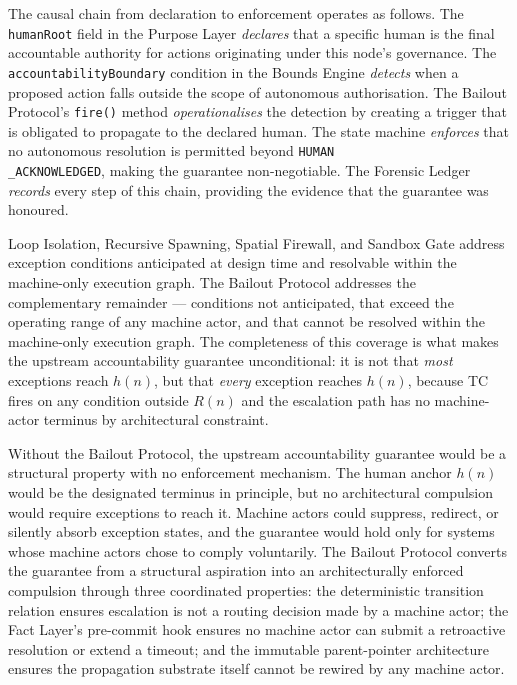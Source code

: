 The causal chain from declaration to enforcement operates as follows. The \texttt{humanRoot} field in the Purpose Layer \emph{declares} that a specific human is the final accountable authority for actions originating under this node's governance. The \texttt{accountabilityBoundary} condition in the Bounds Engine \emph{detects} when a proposed action falls outside the scope of autonomous authorisation. The Bailout Protocol's \texttt{fire()} method \emph{operationalises} the detection by creating a trigger that is obligated to propagate to the declared human. The state machine \emph{enforces} that no autonomous resolution is permitted beyond \texttt{HUMAN\\_ACKNOWLEDGED}, making the guarantee non-negotiable. The Forensic Ledger \emph{records} every step of this chain, providing the evidence that the guarantee was honoured.

Loop Isolation, Recursive Spawning, Spatial Firewall, and Sandbox Gate address exception conditions anticipated at design time and resolvable within the machine-only execution graph. The Bailout Protocol addresses the complementary remainder — conditions not anticipated, that exceed the operating range of any machine actor, and that cannot be resolved within the machine-only execution graph. The completeness of this coverage is what makes the upstream accountability guarantee unconditional: it is not that \emph{most} exceptions reach $h(n)$, but that \emph{every} exception reaches $h(n)$, because TC fires on any condition outside $R(n)$ and the escalation path has no machine-actor terminus by architectural constraint.

Without the Bailout Protocol, the upstream accountability guarantee would be a structural property with no enforcement mechanism. The human anchor $h(n)$ would be the designated terminus in principle, but no architectural compulsion would require exceptions to reach it. Machine actors could suppress, redirect, or silently absorb exception states, and the guarantee would hold only for systems whose machine actors chose to comply voluntarily. The Bailout Protocol converts the guarantee from a structural aspiration into an architecturally enforced compulsion through three coordinated properties: the deterministic transition relation ensures escalation is not a routing decision made by a machine actor; the Fact Layer's pre-commit hook ensures no machine actor can submit a retroactive resolution or extend a timeout; and the immutable parent-pointer architecture ensures the propagation substrate itself cannot be rewired by any machine actor.


